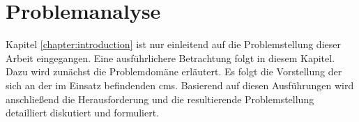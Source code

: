 \chapter{Problemanalyse}
    Kapitel \ref{chapter:introduction} ist nur einleitend
    auf die Problemstellung dieser Arbeit eingegangen.
    Eine ausführlichere Betrachtung folgt in diesem Kapitel.
    Dazu wird zunächst die Problemdomäne erläutert.
    Es folgt die Vorstellung der sich an der {\fernUni}
    im Einsatz befindenden \gls{cms}.
    Basierend auf diesen Ausführungen wird anschließend
    die Herausforderung und die resultierende Problemstellung
    detailliert diskutiert und formuliert.

    \label{chapter:ProblemAnalysis}
    
    
    




    
